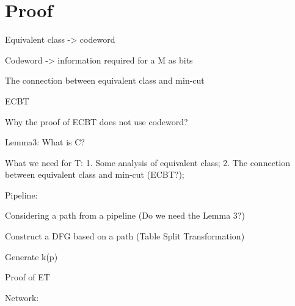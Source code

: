 \section{Proof}

Equivalent class -> codeword

Codeword -> information required for a M as bits

The connection between equivalent class and min-cut

ECBT

Why the proof of ECBT does not use codeword?

Lemma3: What is C?

What we need for T: 1. Some analysis of equivalent class; 2. The connection between equivalent class and min-cut (ECBT?);


Pipeline:

Considering a path from a pipeline (Do we need the Lemma 3?)

Construct a DFG based on a path (Table Split Transformation)

Generate k(p)

Proof of ET


Network:



